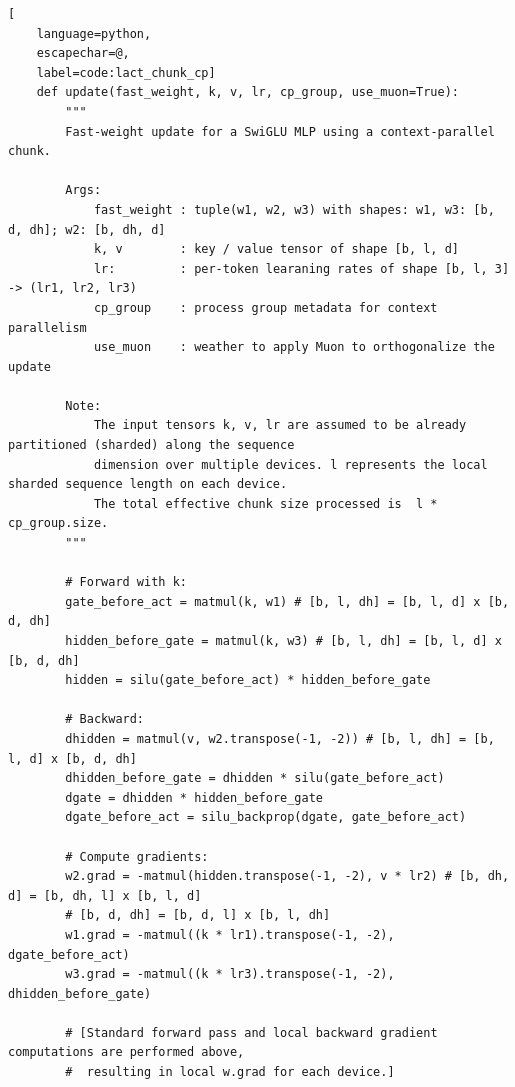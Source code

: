 \documentclass{article}
\begin{document}
\begin{algorithm}[t]

\caption{Large Chunk Test-Time Training Layer with Context Parallel Sharded inside chunk Pseudocode}\label{alg:lact_chunk_cp}
\newcommand{\hlbox}[1]{
  \fboxsep=1.2pt\hspace*{-\fboxsep}\colorbox{blue!10}{\detokenize{#1}}
}
\lstset{style=mocov3}
\begin{lstlisting}[
    language=python,
    escapechar=@,
    label=code:lact_chunk_cp]
    def update(fast_weight, k, v, lr, cp_group, use_muon=True):
        """
        Fast-weight update for a SwiGLU MLP using a context-parallel chunk. 

        Args:
            fast_weight : tuple(w1, w2, w3) with shapes: w1, w3: [b, d, dh]; w2: [b, dh, d]
            k, v        : key / value tensor of shape [b, l, d]
            lr:         : per-token learaning rates of shape [b, l, 3] -> (lr1, lr2, lr3)
            cp_group    : process group metadata for context parallelism
            use_muon    : weather to apply Muon to orthogonalize the update

        Note:
            The input tensors k, v, lr are assumed to be already partitioned (sharded) along the sequence 
            dimension over multiple devices. l represents the local sharded sequence length on each device.
            The total effective chunk size processed is  l * cp_group.size.
        """

        # Forward with k:
        gate_before_act = matmul(k, w1) # [b, l, dh] = [b, l, d] x [b, d, dh]
        hidden_before_gate = matmul(k, w3) # [b, l, dh] = [b, l, d] x [b, d, dh]
        hidden = silu(gate_before_act) * hidden_before_gate

        # Backward:
        dhidden = matmul(v, w2.transpose(-1, -2)) # [b, l, dh] = [b, l, d] x [b, d, dh]
        dhidden_before_gate = dhidden * silu(gate_before_act)
        dgate = dhidden * hidden_before_gate
        dgate_before_act = silu_backprop(dgate, gate_before_act)

        # Compute gradients: 
        w2.grad = -matmul(hidden.transpose(-1, -2), v * lr2) # [b, dh, d] = [b, dh, l] x [b, l, d]
        # [b, d, dh] = [b, d, l] x [b, l, dh]
        w1.grad = -matmul((k * lr1).transpose(-1, -2), dgate_before_act)
        w3.grad = -matmul((k * lr3).transpose(-1, -2), dhidden_before_gate)

        # [Standard forward pass and local backward gradient computations are performed above,
        #  resulting in local w.grad for each device.]


\end{lstlisting}
\end{algorithm}
\end{document}
